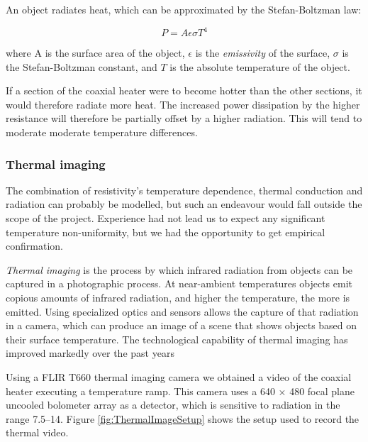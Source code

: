 An object radiates heat, which can be approximated by the Stefan-Boltzman law:

\[P=A \epsilon \sigma T^4\]

where A is the surface area of the object, \(\epsilon\) is the
\textit{emissivity} of the surface, \(\sigma\) is the Stefan-Boltzman constant,
and \(T\) is the absolute temperature of the object. 

If a section of the coaxial heater were to become hotter than the other
sections, it would therefore radiate more heat. The increased power dissipation
by the higher resistance will therefore be partially offset by a higher
radiation. This will tend to moderate moderate temperature differences.

\subsubsection{Thermal imaging}

The combination of resistivity's temperature dependence, thermal conduction and
radiation can probably be modelled, but such an endeavour would fall outside the
scope of the project. Experience had not lead us to expect any significant
temperature non-uniformity, but we had the opportunity to get empirical
confirmation.

\textit{Thermal imaging} is the process by which infrared radiation from objects
can be captured in a photographic process. At near-ambient temperatures objects
emit copious amounts of infrared radiation, and higher the temperature, the more
is emitted. Using specialized optics and sensors allows the capture of that
radiation in a camera, which can produce an image of a scene that shows objects
based on their surface temperature. The technological capability of thermal
imaging has improved markedly over the past years

Using a FLIR{\texttrademark} T660 thermal imaging camera we obtained a video of
the coaxial heater executing a temperature ramp. This camera uses a 640 × 480
focal plane uncooled bolometer array as a detector, which is sensitive to
radiation in the range \SIrange{7.5}{14}{\micro}{\metre}. Figure
\ref{fig:ThermalImageSetup} shows the setup used to record the thermal video.

